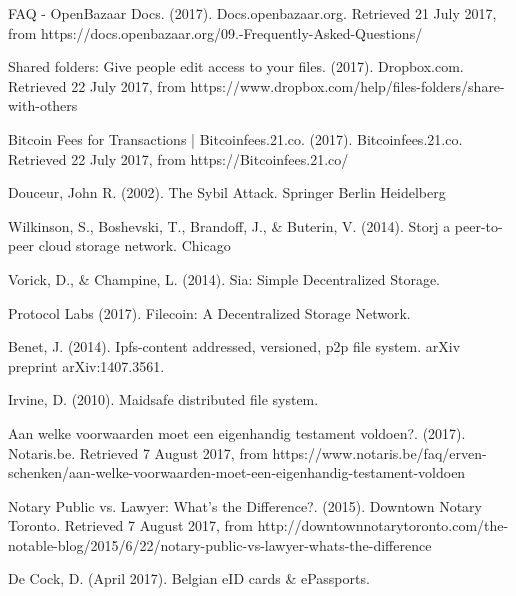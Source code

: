 \begin{thebibliography}{99}
FAQ - OpenBazaar Docs. (2017). Docs.openbazaar.org. Retrieved 21 July 2017, from https://docs.openbazaar.org/09.-Frequently-Asked-Questions/

Shared folders: Give people edit access to your files. (2017). Dropbox.com. Retrieved 22 July 2017, from https://www.dropbox.com/help/files-folders/share-with-others

Bitcoin Fees for Transactions | Bitcoinfees.21.co. (2017). Bitcoinfees.21.co. Retrieved 22 July 2017, from https://Bitcoinfees.21.co/


Douceur, John R. (2002). The Sybil Attack. Springer Berlin Heidelberg


Wilkinson, S., Boshevski, T., Brandoff, J., \& Buterin, V. (2014). Storj a peer-to-peer cloud storage network. Chicago 

Vorick, D., \& Champine, L. (2014). Sia: Simple Decentralized Storage.

Protocol Labs (2017). Filecoin: A Decentralized Storage Network.

Benet, J. (2014). Ipfs-content addressed, versioned, p2p file system. arXiv preprint arXiv:1407.3561.

Irvine, D. (2010). Maidsafe distributed file system.

Aan welke voorwaarden moet een eigenhandig testament voldoen?. (2017). Notaris.be. Retrieved 7 August 2017, from https://www.notaris.be/faq/erven-schenken/aan-welke-voorwaarden-moet-een-eigenhandig-testament-voldoen

Notary Public vs. Lawyer: What's the Difference?. (2015). Downtown Notary Toronto. Retrieved 7 August 2017, from http://downtownnotarytoronto.com/the-notable-blog/2015/6/22/notary-public-vs-lawyer-whats-the-difference

De Cock, D. (April 2017). Belgian eID cards \& ePassports.

\end{thebibliography}
